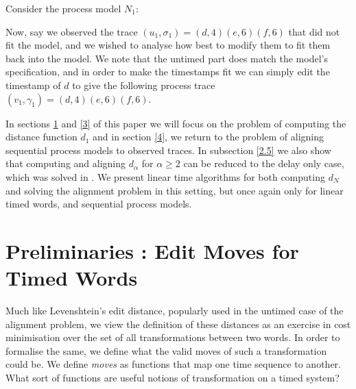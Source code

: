 \documentclass[runningheads]{llncs}
\newcommand\eye{\ensurestackMath{\stackinset{c}{}{c}{-.33pt}%
		{\bullet}{\bigcirc}}}
\begin{document}
	\begin{example}
	Consider the process model $N_1$: 

	\adjustbox{scale = 0.9}{
		\begin{tikzcd}
			&{}&& {}&&{} & \\
			\eye &\fbox{d}& \bigcirc & {\fbox{e}} & \bigcirc & \fbox{f} & \bigcirc_f\\
			\arrow[from=2-1, to=2-2]
			\arrow[ from=2-2, to=2-3]
			\arrow[from=2-3, to=2-4]
			\arrow[from=2-4, to=2-5]
			\arrow[from=2-5, to=2-6]
			\arrow[from=2-6, to=2-7]
			\arrow["{[1,3]}"{description, pos=0.2}, draw=white, from=2-2, to=1-2]
			\arrow["{[1,4]}"{description, pos=0.3}, draw=white, from=2-4, to=1-4]
			\arrow["{[0, 3]}"{description, pos=0.2}, draw=white, from=2-6, to=1-6]
		\end{tikzcd}
	}
Now, say we observed the trace $(u_1, \sigma_1) = (d, 4)(e, 6)(f, 6)$ that did not fit the model, and we wished to analyse how best to modify them to fit them back into the model. We note that the untimed part does match the model's specification, and in order to make the timestamps fit we can simply edit the timestamp of $d$ to give the following process trace $(v_1, \gamma_1) = (d, 4)(e, 6)(f, 6)$. 
	
	
	\end{example}
	In sections \ref{2} and \ref{3} of this paper we will focus on the problem of computing the distance function $d_1$ and in section \ref{4}, we return to the problem of aligning sequential process models to observed traces. 
	In subsection \ref{2.5} we also show that computing and aligning $d_{\alpha}$ for $\alpha \geq 2$ can be reduced to the delay only case, which was solved in \cite{CR22}. 
	We present linear time algorithms for both computing $d_N$ and solving the alignment problem in this setting, but once again only for linear timed words, and sequential process models.  

	\section{Preliminaries : Edit Moves for Timed Words}
	\label{2}
	
	Much like Levenshtein's edit distance, popularly used in the untimed case of the alignment problem, we view the definition of these distances as an exercise in cost minimisation over the set of all transformations between two words. 
	In order to formalise the same, we define what the valid moves of such a transformation could be. 
	We define \textit{moves} as functions that map one time sequence to another. 
	What sort of functions are useful notions of transformation on a timed system? 
\end{document}

